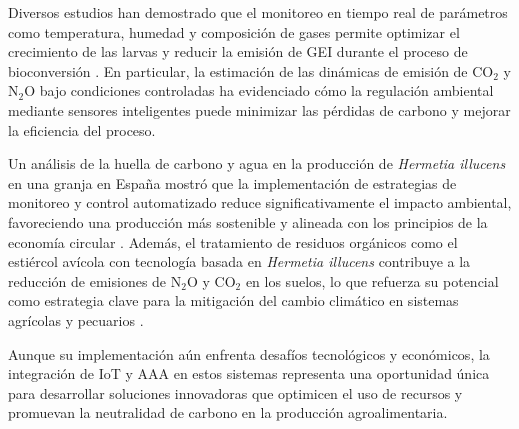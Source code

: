 Diversos estudios han demostrado que el monitoreo en tiempo real de parámetros como temperatura, humedad y composición de gases permite optimizar el crecimiento de las larvas y reducir la emisión de GEI durante el proceso de bioconversión \parencite{rossiEstimatingDynamicsGreenhouse2024,tsaabitahDataCommunicationUsing2022}. En particular, la estimación de las dinámicas de emisión de CO$_2$ y N$_2$O bajo condiciones controladas ha evidenciado cómo la regulación ambiental mediante sensores inteligentes puede minimizar las pérdidas de carbono y mejorar la eficiencia del proceso. 

Un análisis de la huella de carbono y agua en la producción de \textit{Hermetia illucens} en una granja en España mostró que la implementación de estrategias de monitoreo y control automatizado reduce significativamente el impacto ambiental, favoreciendo una producción más sostenible y alineada con los principios de la economía circular \parencite{IPCC2014,galan-diazCarbonWaterFootprint2024}. Además, el tratamiento de residuos orgánicos como el estiércol avícola con tecnología basada en \textit{Hermetia illucens} contribuye a la reducción de emisiones de N$_2$O y CO$_2$ en los suelos, lo que refuerza su potencial como estrategia clave para la mitigación del cambio climático en sistemas agrícolas y pecuarios \parencite{jenkinsProcessingPoultryManure2025}.

Aunque su implementación aún enfrenta desafíos tecnológicos y económicos, la integración de IoT y AAA en estos sistemas representa una oportunidad única para desarrollar soluciones innovadoras que optimicen el uso de recursos y promuevan la neutralidad de carbono en la producción agroalimentaria.